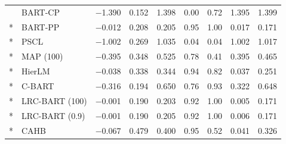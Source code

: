 \begin{longtable}{llccccccc}
& BART-CP & $-$1.390 & 0.152 & 1.398 & 0.00 & 0.72 & 1.395 & 1.399 \\*
& BART-PP & $-$0.012 & 0.208 & 0.205 & 0.95 & 1.00 & 0.017 & 0.171 \\*
& PSCL & $-$1.002 & 0.269 & 1.035 & 0.04 & 0.04 & 1.002 & 1.017 \\*
& MAP (100) & $-$0.395 & 0.348 & 0.525 & 0.78 & 0.41 & 0.395 & 0.465 \\*
& HierLM & $-$0.038 & 0.338 & 0.344 & 0.94 & 0.82 & 0.037 & 0.251 \\*
& C-BART & $-$0.316 & 0.194 & 0.650 & 0.76 & 0.93 & 0.322 & 0.648 \\*
& LRC-BART (100) & $-$0.001 & 0.190 & 0.203 & 0.92 & 1.00 & 0.005 & 0.171 \\*
& LRC-BART (0.9) & $-$0.001 & 0.190 & 0.205 & 0.92 & 1.00 & 0.006 & 0.171 \\*
& CAHB & $-$0.067 & 0.479 & 0.400 & 0.95 & 0.52 & 0.041 & 0.326 \\
\end{longtable}
\endgroup
